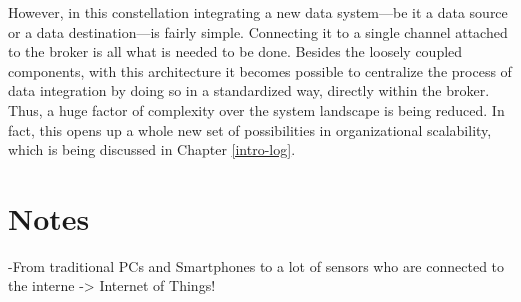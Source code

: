 However, in this constellation integrating a new data system---be it a data source or a data destination---is fairly 
simple. Connecting it to a single channel attached to the broker is all what is needed 
to be done. Besides the loosely coupled components, with this architecture
it becomes possible to centralize the process of data integration by doing so
in a standardized way, directly within the broker. Thus, a huge factor of complexity 
over the system landscape is being reduced. In fact, this opens up a whole new
set of possibilities in organizational scalability, which is being discussed in
Chapter \ref{intro-log}.

\section{Notes}

-From traditional PCs and Smartphones to a lot of sensors who are connected to
the interne -> Internet of Things!




